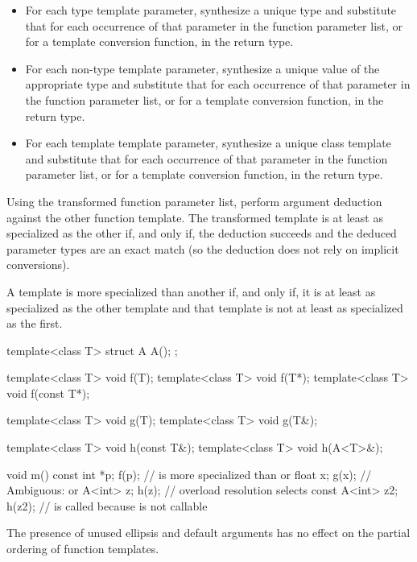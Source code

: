 \begin{itemize}
\item
For each type template parameter, synthesize a unique type and substitute
that for each occurrence of that parameter in the function parameter list,
or for a template conversion function, in the return type.
\item
For each non-type template parameter, synthesize a unique value of the
appropriate type and substitute that for each occurrence of that parameter
in the function parameter list, or for a template conversion function,
in the return type.
\item
For each template template parameter, synthesize a unique class template
and substitute that for each occurrence of that parameter in the function
parameter list, or for a template conversion function, in the return type.
\end{itemize}

\pnum
Using the transformed function parameter list, perform argument deduction
against the other function template. The transformed template is at least
as specialized as the other if, and only if, the deduction succeeds and
the deduced parameter types are an exact match (so the deduction does not
rely on implicit conversions).

\pnum
A template is more specialized than another if, and only if, it is at least
as specialized as the other template and that template is not at least
as specialized as the first.
\enterexample

\begin{codeblock}
template<class T> struct A { A(); };

template<class T> void f(T);
template<class T> void f(T*);
template<class T> void f(const T*);

template<class T> void g(T);
template<class T> void g(T&);

template<class T> void h(const T&);
template<class T> void h(A<T>&);

void m() {
	const int *p;
	f(p);			//  is more specialized than  or 
	float x;
	g(x);			// Ambiguous:  or 
	A<int> z;
	h(z);			// overload resolution selects 
	const A<int> z2;
	h(z2);			//  is called because  is not callable
}
\end{codeblock}
\exitexampleb

\pnum
The presence of unused ellipsis and default arguments has no effect on
the partial ordering of function templates.
\enterexample

